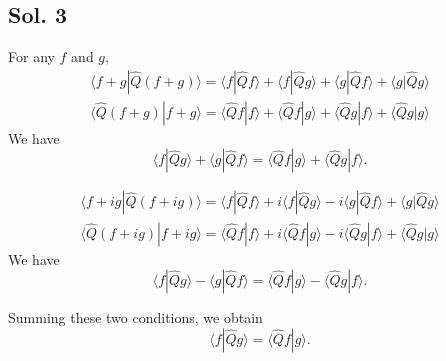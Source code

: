 \subsection*{Sol. 3}
For any $f$ and $g,$
\begin{align*}
    \langle f+g|\hat{Q}(f+g)\rangle
    =\langle f|\hat{Q}f\rangle+
    \langle f|\hat{Q}g\rangle+
    \langle g|\hat{Q}f\rangle+
    \langle g|\hat{Q}g\rangle
\end{align*}
\begin{align*}
    \langle \hat{Q}(f+g)|f+g\rangle
    =\langle \hat{Q}f|f\rangle+
    \langle \hat{Q}f|g\rangle+
    \langle \hat{Q}g|f\rangle+
    \langle \hat{Q}g|g\rangle
\end{align*}
We have 
$$
\langle f|\hat{Q}g\rangle+
\langle g|\hat{Q}f\rangle
=\langle \hat{Q}f|g\rangle+
\langle \hat{Q}g|f\rangle.
$$

\begin{align*}
    \langle f+ig|\hat{Q}(f+ig)\rangle
    =\langle f|\hat{Q}f\rangle+
    i\langle f|\hat{Q}g\rangle
    -i\langle g|\hat{Q}f\rangle+
    \langle g|\hat{Q}g\rangle
\end{align*}
\begin{align*}
    \langle \hat{Q}(f+ig)|f+ig\rangle
    =\langle \hat{Q}f|f\rangle+
    i\langle \hat{Q}f|g\rangle
    -i\langle \hat{Q}g|f\rangle+
    \langle \hat{Q}g|g\rangle
\end{align*}
We have 
$$
\langle f|\hat{Q}g\rangle
-\langle g|\hat{Q}f\rangle
=\langle \hat{Q}f|g\rangle
-\langle \hat{Q}g|f\rangle.
$$

Summing these two conditions, we obtain
$$
\langle f|\hat{Q}g\rangle=\langle \hat{Q}f|g\rangle.
$$

